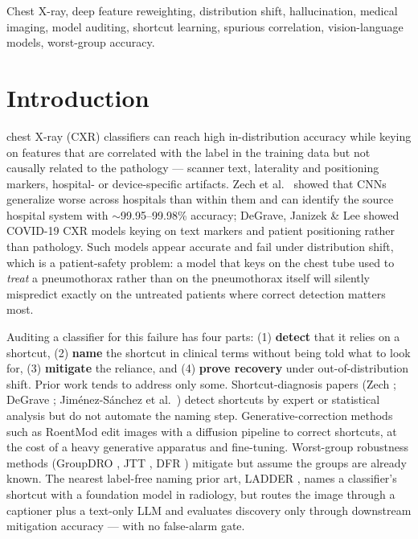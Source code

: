 \documentclass{ieeeaccess}
\begin{document}
\begin{IEEEkeywords}
Chest X-ray, deep feature reweighting, distribution shift, hallucination, medical imaging, model auditing, shortcut learning, spurious correlation, vision-language models, worst-group accuracy.
\end{IEEEkeywords}

\titlepgskip=-21pt
\maketitle

\section{Introduction}
 chest X-ray (CXR) classifiers can reach high in-distribution accuracy while keying on features that are correlated with the label in the training data but not causally related to the pathology --- scanner text, laterality and positioning markers, hospital- or device-specific artifacts. Zech et al.\ \cite{zech2018} showed that CNNs generalize worse across hospitals than within them and can identify the source hospital system with $\sim$99.95--99.98\% accuracy; DeGrave, Janizek \& Lee \cite{degrave2021} showed COVID-19 CXR models keying on text markers and patient positioning rather than pathology. Such models appear accurate and fail under distribution shift, which is a patient-safety problem: a model that keys on the chest tube used to \emph{treat} a pneumothorax rather than on the pneumothorax itself will silently mispredict exactly on the untreated patients where correct detection matters most.

Auditing a classifier for this failure has four parts: (1) \textbf{detect} that it relies on a shortcut, (2) \textbf{name} the shortcut in clinical terms without being told what to look for, (3) \textbf{mitigate} the reliance, and (4) \textbf{prove recovery} under out-of-distribution shift. Prior work tends to address only some. Shortcut-diagnosis papers (Zech \cite{zech2018}; DeGrave \cite{degrave2021}; Jim\'enez-S\'anchez et al.\ \cite{jimenez2023}) detect shortcuts by expert or statistical analysis but do not automate the naming step. Generative-correction methods such as RoentMod \cite{roentmod} edit images with a diffusion pipeline to correct shortcuts, at the cost of a heavy generative apparatus and fine-tuning. Worst-group robustness methods (GroupDRO \cite{sagawa2020groupdro}, JTT \cite{liu2021jtt}, DFR \cite{kirichenko2022dfr}) mitigate but assume the groups are already known. The nearest label-free naming prior art, LADDER \cite{ladder}, names a classifier's shortcut with a foundation model in radiology, but routes the image through a captioner plus a text-only LLM and evaluates discovery only through downstream mitigation accuracy --- with no false-alarm gate.
\end{document}
